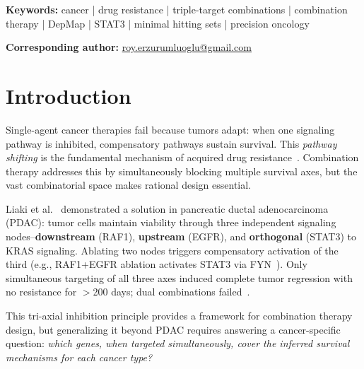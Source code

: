 \documentclass[11pt]{article}
\newenvironment{keywords}{\noindent\textbf{Keywords:} }{\par}%
\begin{document}
\begin{keywords}
cancer | drug resistance | triple-target combinations | combination therapy | DepMap | STAT3 | minimal hitting sets | precision oncology
\end{keywords}

\noindent\textbf{Corresponding author:} \href{mailto:roy.erzurumluoglu@gmail.com}{roy.erzurumluoglu@gmail.com}

\newpage
\twocolumn
\raggedbottom
\sloppy

\renewcommand{\dbltopfraction}{0.9}      %
\renewcommand{\textfraction}{0.07}       %
\renewcommand{\dblfloatpagefraction}{0.7}%
\setcounter{dbltopnumber}{2}             %
\setcounter{topnumber}{3}
\setcounter{totalnumber}{5}


\section*{Introduction}

Single-agent cancer therapies fail because tumors adapt: when one signaling pathway is inhibited, compensatory pathways sustain survival. This \emph{pathway shifting} is the fundamental mechanism of acquired drug resistance~\cite{Bergholz2021,Xin2024}. Combination therapy addresses this by simultaneously blocking multiple survival axes, but the vast combinatorial space makes rational design essential.

Liaki et al.~\cite{Liaki2025} demonstrated a solution in pancreatic ductal adenocarcinoma (PDAC): tumor cells maintain viability through three independent signaling nodes--\textbf{downstream} (RAF1), \textbf{upstream} (EGFR), and \textbf{orthogonal} (STAT3) to KRAS signaling. Ablating two nodes triggers compensatory activation of the third (e.g., RAF1+EGFR ablation activates STAT3 via FYN~\cite{Chougule2016,Zhang2020FYN}). Only simultaneous targeting of all three axes induced complete tumor regression with no resistance for $>$200 days; dual combinations failed~\cite{Liaki2025}.

This tri-axial inhibition principle provides a framework for combination therapy design, but generalizing it beyond PDAC requires answering a cancer-specific question: \emph{which genes, when targeted simultaneously, cover the inferred survival mechanisms for each cancer type?}
\end{document}

